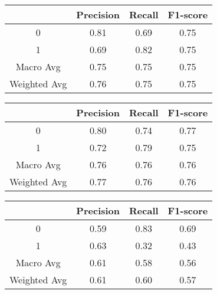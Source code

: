 \documentclass[11pt,a4paper]{article}
\begin{document}
\begin{table}[!ht]
\centering
        \begin{tabular}{@{}cccc@{}}\toprule
                     & Precision & Recall & F1-score \\ \midrule
        0            & 0.81      & 0.69   & 0.75     \\
        1            & 0.69      & 0.82   & 0.75     \\ \hline
        Macro Avg    & 0.75      & 0.75   & 0.75     \\
        Weighted Avg & 0.76      & 0.75   & 0.75     \\ \bottomrule
        \end{tabular}
    \label{tab:m-bert-br} 
\end{table}

\begin{table}[!ht]
\centering
        \begin{tabular}{@{}cccc@{}}\toprule
                         & Precision & Recall & F1-score \\ \midrule
            0            & 0.80      & 0.74   & 0.77     \\ 
            1            & 0.72      & 0.79   & 0.75     \\ \hline
            Macro Avg    & 0.76      & 0.76   & 0.76     \\ 
            Weighted Avg & 0.77      & 0.76   & 0.76     \\ \bottomrule
        \end{tabular}
        \label{tab:m-bert-transfer}
\end{table}

\begin{table}[!ht]
\centering
    \begin{tabular}{@{}cccc@{}}\toprule
                     & Precision & Recall & F1-score \\ \midrule
        0            & 0.59      & 0.83   & 0.69     \\
        1            & 0.63      & 0.32   & 0.43     \\ \hline
        Macro Avg    & 0.61      & 0.58   & 0.56     \\
        Weighted Avg & 0.61      & 0.60   & 0.57     \\ \bottomrule
        \end{tabular}
    \label{tab:m-bert-zero}
\end{table}
\end{document}
